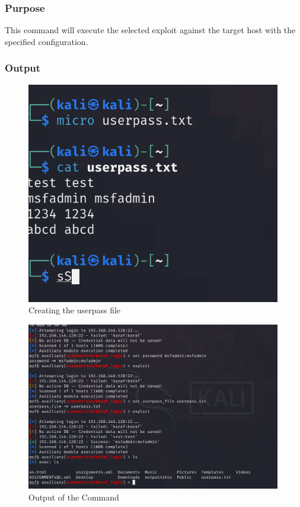 \documentclass[11pt]{article}
\begin{document}
\subsubsection*{Purpose}
This command will execute the selected exploit against the target host with the specified configuration.
\subsubsection*{Output}
\begin{figure}[H]
    \centering
    \includegraphics[width=0.99\textwidth]{a3_ss (27).png}
    \caption{Creating the userpass file}
\end{figure}
\begin{figure}[H]
    \centering
    \includegraphics[width=0.99\textwidth]{a3_ss (26).png}
    \caption{Output of the Command}
\end{figure}
\end{document}
